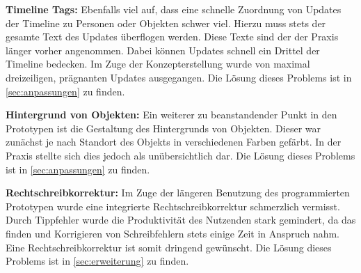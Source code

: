 \textbf{Timeline Tags:} Ebenfalls viel auf, dass eine schnelle Zuordnung von Updates der Timeline zu Personen oder Objekten schwer viel.
Hierzu muss stets der gesamte Text des Updates überflogen werden.
Diese Texte sind der der Praxis länger vorher angenommen.
Dabei können Updates schnell ein Drittel der Timeline bedecken.
Im Zuge der Konzepterstellung wurde von maximal dreizeiligen, prägnanten Updates ausgegangen.
Die Lösung dieses Problems ist in \autoref{sec:anpassungen} zu finden.

\textbf{Hintergrund von Objekten:} Ein weiterer zu beanstandender Punkt in den Prototypen ist die Gestaltung des Hintergrunds von Objekten.
Dieser war zunächst je nach Standort des Objekts in verschiedenen Farben gefärbt.
In der Praxis stellte sich dies jedoch als unübersichtlich dar.
Die Lösung dieses Problems ist in \autoref{sec:anpassungen} zu finden.

\textbf{Rechtschreibkorrektur:} Im Zuge der längeren Benutzung des programmierten Prototypen wurde eine integrierte Rechtschreibkorrektur schmerzlich vermisst.
Durch Tippfehler wurde die Produktivität des Nutzenden stark gemindert, da das finden und Korrigieren von Schreibfehlern stets einige Zeit in Anspruch nahm.
Eine Rechtschreibkorrektur ist somit dringend gewünscht.
Die Lösung dieses Problems ist in \autoref{sec:erweiterung} zu finden.